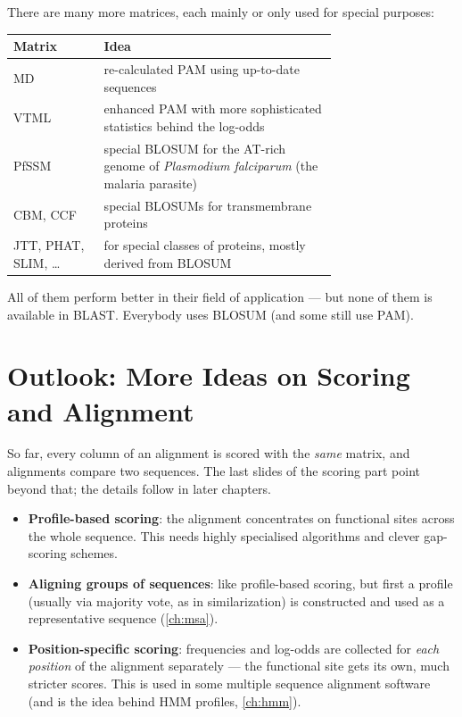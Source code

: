 \documentclass[11pt, oneside]{book}
\let\originalsection\section
\renewcommand{\section}{\Needspace{7\baselineskip}\originalsection}
\begin{document}
There are many more matrices, each mainly or only used for special purposes:
\begin{center}
\small
\begin{tabular}{@{}lp{0.72\linewidth}@{}}
\toprule
\textbf{Matrix} & \textbf{Idea} \\
\midrule
MD   & re-calculated PAM using up-to-date sequences \\
VTML & enhanced PAM with more sophisticated statistics behind the log-odds \\
PfSSM & special BLOSUM for the AT-rich genome of \emph{Plasmodium falciparum}
  (the malaria parasite) \\
CBM, CCF & special BLOSUMs for transmembrane proteins \\
JTT, PHAT, SLIM, \ldots & for special classes of proteins, mostly derived from BLOSUM \\
\bottomrule
\end{tabular}
\end{center}
All of them perform better in their field of application --- but none of them
is available in BLAST. Everybody uses BLOSUM (and some still use PAM).

\section{Outlook: More Ideas on Scoring and Alignment}
\label{sec:more-alignment}

So far, every column of an alignment is scored with the \emph{same} matrix,
and alignments compare two sequences. The last slides of the scoring part
point beyond that; the details follow in later chapters.

\begin{itemize}
  \item \textbf{Profile-based scoring}: the alignment concentrates on
    functional sites across the whole sequence. This needs highly specialised
    algorithms and clever gap-scoring schemes.
  \item \textbf{Aligning groups of sequences}: like profile-based scoring, but
    first a profile (usually via majority vote, as in similarization) is
    constructed and used as a representative sequence (\cref{ch:msa}).
  \item \textbf{Position-specific scoring}: frequencies and log-odds are
    collected for \emph{each position} of the alignment separately --- the
    functional site gets its own, much stricter scores. This is used in some
    multiple sequence alignment software (and is the idea behind HMM
    profiles, \cref{ch:hmm}).
\end{itemize}
\end{document}
